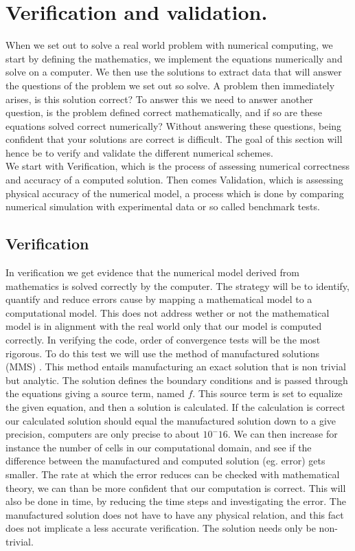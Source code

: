 \chapter{Verification and validation. }
When we set out to solve a real world problem with numerical computing, we start by defining the mathematics, we implement the equations numerically and solve on a computer. We then use the solutions to extract data that will answer the questions of the problem we set out so solve. A problem then immediately arises, is this solution correct? To answer this we need to answer another question, is the problem defined correct mathematically, and if so are these equations solved correct numerically? Without answering these questions, being confident that your solutions are correct is difficult. \cite{Selin2014} The goal of this section will hence be to verify and validate the different numerical schemes. \\
We start with Verification, which is the process of assessing numerical correctness and accuracy of a computed solution. Then comes Validation, which is assessing physical accuracy of the numerical model, a process which is done by comparing numerical simulation with experimental data or so called benchmark tests.


\section{Verification}
In verification we get evidence that the numerical model derived from mathematics is solved correctly by the computer. The strategy will be to identify, quantify and reduce errors cause by mapping a mathematical model to a computational model. This does not address wether or not the mathematical model is in alignment with the real world only that our model is computed correctly.
In verifying the code, order of convergence tests will be the most rigorous. To do this test we will use the method of manufactured solutions (MMS) \cite{Roache2002}. This method entails manufacturing an exact solution that is non trivial but analytic. The solution defines the boundary conditions and is passed through the equations giving a source term, named $f$. This source term is set to equalize the given equation, and then a solution is calculated. If the calculation is correct our calculated solution should equal the manufactured solution down to a give precision, computers are only precise to about $10^-16$. We can then increase for instance the number of cells in our computational domain, and see if the difference between the manufactured and computed solution (eg. error) gets smaller. The rate at which the error reduces can be checked with mathematical theory, we can than be more confident that our computation is correct. This will also be done in time, by reducing the time steps and investigating the error. The manufactured solution does not have to have any physical relation, and this fact does not implicate a less accurate verification. The solution needs only be non-trivial.

